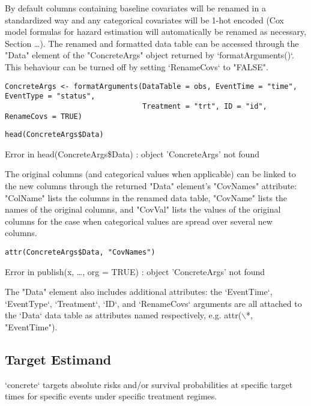 \documentclass{report}
\newcommand{\1}{\ensuremath{\mathbf{1}}}
\begin{document}
By default columns containing baseline covariates will be renamed in a standardized way and any categorical covariates will be 1-hot encoded (Cox model formulas for hazard estimation will automatically be renamed as necessary, Section \ldots{}). The renamed and formatted data table can be accessed through the "Data" element of the "ConcreteArgs" object returned by `formatArguments()`. This behaviour can be turned off by setting `RenameCovs` to "FALSE".

\begin{lstlisting}
ConcreteArgs <- formatArguments(DataTable = obs, EventTime = "time", EventType = "status", 
                                Treatment = "trt", ID = "id", RenameCovs = TRUE)
\end{lstlisting}

\begin{lstlisting}
head(ConcreteArgs$Data)
\end{lstlisting}

Error in head(ConcreteArgs\$Data) : object 'ConcreteArgs' not found

The original columns (and categorical values when applicable) can be linked to the new columns through the returned "Data" element's "CovNames" attribute: "ColName" lists the columns in the renamed data table, "CovName" lists the names of the original columns, and "CovVal" lists the values of the original columns for the case when categorical values are spread over several new columns.   

\begin{lstlisting}
attr(ConcreteArgs$Data, "CovNames")
\end{lstlisting}

Error in publish(x, \ldots{}, org = TRUE) : object 'ConcreteArgs' not found

The "Data" element also includes additional attributes: the `EventTime`, `EventType`, `Treatment`, `ID`, and `RenameCovs` arguments are all attached to the `Data` data table as attributes named respectively, e.g. attr($\backslash$*, "EventTime").

\subsection{Target Estimand}
`concrete` targets absolute risks and/or survival probabilities at specific target times for specific events under specific treatment regimes. 
\end{document}
